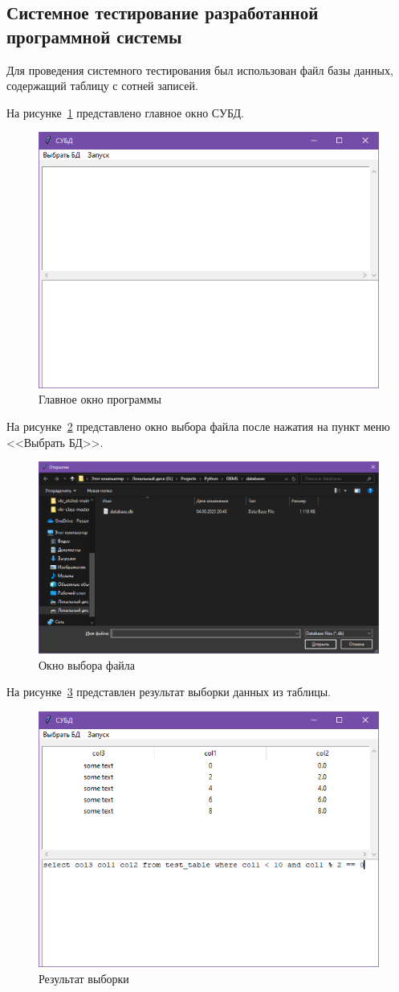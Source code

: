 \subsection{Системное тестирование разработанной программной системы}

Для проведения системного тестирования был использован файл базы данных, содержащий таблицу с сотней записей.

На рисунке~\ref{fig:dbms_window} представлено главное окно СУБД.
\begin{figure}[H]
	\centering
	\includegraphics[width=0.7\linewidth]{"images/окно субд"}
	\caption{Главное окно программы}
	\label{fig:dbms_window}
\end{figure}

На рисунке~\ref{fig:select} представлено окно выбора файла после нажатия на пункт меню <<Выбрать БД>>.
\begin{figure}[H]
	\centering
	\includegraphics[width=0.7\linewidth]{"images/выбор файла"}
	\caption{Окно выбора файла}
	\label{fig:select}
\end{figure}

На рисунке~\ref{fig:select_sql} представлен результат выборки данных из таблицы.
\begin{figure}[H]
	\centering
	\includegraphics[width=0.7\linewidth]{"images/выборка"}
	\caption{Результат выборки}
	\label{fig:select_sql}
\end{figure}

